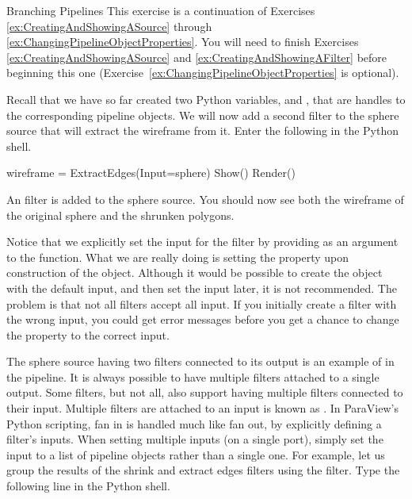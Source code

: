 \begin{exercise}{Branching Pipelines}
  \label{ex:BranchingPipelines}%
  This exercise is a continuation of Exercises
  \ref{ex:CreatingAndShowingASource} through
  \ref{ex:ChangingPipelineObjectProperties}.  You will need to finish
  Exercises \ref{ex:CreatingAndShowingASource} and
  \ref{ex:CreatingAndShowingAFilter} before beginning this one
  (Exercise~\ref{ex:ChangingPipelineObjectProperties} is optional).

  Recall that we have so far created two Python variables, 
  and , that are handles to the corresponding pipeline
  objects.  We will now add a second filter to the sphere source that will
  extract the wireframe from it.  Enter the following in the Python shell.

  \begin{python}
wireframe = ExtractEdges(Input=sphere)
Show()
Render()
  \end{python}

  An  filter is added to the sphere source.  You should
  now see both the wireframe of the original sphere and the shrunken
  polygons.

  Notice that we explicitly set the input for the 
  filter by providing  as an argument to the
   function.  What we are really doing is setting the
   property upon construction of the object.  Although it
  would be possible to create the object with the default input, and then
  set the input later, it is not recommended.  The problem is that not all
  filters accept all input.  If you initially create a filter with the
  wrong input, you could get error messages before you get a chance to
  change the  property to the correct input.

  The sphere source having two filters connected to its output is an
  example of  in the pipeline.  It is always possible to
  have multiple filters attached to a single output.  Some filters, but not
  all, also support having multiple filters connected to their input.
  Multiple filters are attached to an input is known as .
  In ParaView's Python scripting, fan in is handled much like fan out, by
  explicitly defining a filter's inputs.  When setting multiple inputs (on
  a single port), simply set the input to a list of pipeline objects rather
  than a single one.  For example, let us group the results of the shrink
  and extract edges filters using the  filter.  Type
  the following line in the Python shell.


\end{exercise}
